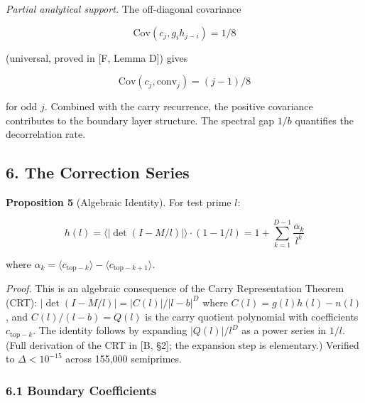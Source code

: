 \documentclass[
  11pt,
]{article}
\begin{document}
\emph{Partial analytical support.} The off-diagonal covariance

\[\mathrm{Cov}(c_j, g_i h_{j-i}) = 1/8\]

(universal, proved in {[}F, Lemma D{]}) gives

\[\mathrm{Cov}(c_j, \mathrm{conv}_j) = (j-1)/8\]

for odd \(j\). Combined with the carry recurrence, the positive covariance
contributes to the boundary layer structure. The spectral gap \(1/b\) quantifies
the decorrelation rate.

\newpage

\subsection{6. The Correction Series}\label{the-correction-series}

\textbf{Proposition 5} (Algebraic Identity). For test prime \(l\):

\[h(l) = \langle|\det(I - M/l)|\rangle \cdot (1 - 1/l) = 1 + \sum_{k=1}^{D-1} \frac{\alpha_k}{l^k}\]

where
\(\alpha_k = \langle c_{\text{top}-k}\rangle - \langle c_{\text{top}-k+1}\rangle\).

\emph{Proof.} This is an algebraic consequence of the Carry Representation
Theorem (CRT): \(|\det(I - M/l)| = |C(l)|/|l-b|^D\) where
\(C(l) = g(l)h(l) - n(l)\), and \(C(l)/(l-b) = Q(l)\) is the carry quotient
polynomial with coefficients \(c_{\text{top}-k}\). The identity follows by
expanding \(|Q(l)|/l^D\) as a power series in \(1/l\). (Full derivation of the
CRT in {[}B, §2{]}; the expansion step is elementary.) Verified to
\(\Delta < 10^{-15}\) across 155,000 semiprimes.

\subsubsection{6.1 Boundary Coefficients}\label{boundary-coefficients}
\end{document}

